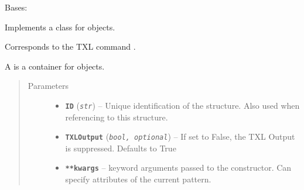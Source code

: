 \documentclass[letterpaper,10pt,english]{sphinxmanual}
\begin{document}

\begin{fulllineitems}
\label{Chapters/PythonModuleReference/Patterns/TXLWizard.Patterns.Structure:TXLWizard.Patterns.Structure.Structure}
Bases: {\hyperref[Chapters/PythonModuleReference/Patterns/TXLWizard.Patterns.AbstractPattern:TXLWizard.Patterns.AbstractPattern.AbstractPattern]{}}

Implements a class for  objects.

Corresponds to the TXL command .

A  is a container for  objects.
\begin{quote}\begin{description}
\item[{Parameters}] \leavevmode\begin{itemize}
\item {} 
\textbf{\texttt{ID}} (\emph{\texttt{str}}) -- Unique identification of the structure. Also used when referencing to this structure.

\item {} 
\textbf{\texttt{TXLOutput}} (\emph{\texttt{bool, optional}}) -- If set to False, the TXL Output is suppressed.
Defaults to True

\item {} 
\textbf{\texttt{**kwargs}} -- keyword arguments passed to the {\hyperref[Chapters/PythonModuleReference/Patterns/TXLWizard.Patterns.AbstractPattern:TXLWizard.Patterns.AbstractPattern.AbstractPattern]{}} constructor.
Can specify attributes of the current pattern.

\end{itemize}

\end{description}\end{quote}


\end{fulllineitems}
\end{document}
